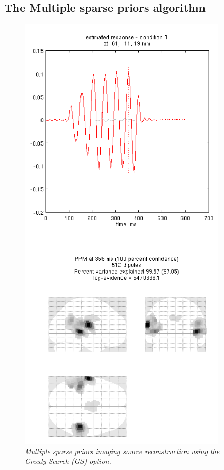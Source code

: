\subsection{The Multiple sparse priors algorithm}

\begin{figure}
\begin{center}
\includegraphics[width=100mm]{meg_sloc/slide6}
\caption{\em Multiple sparse priors imaging source reconstruction using the Greedy Search (GS) option.\label{meg_sloc:fig:6}}
\end{center}
\end{figure}

